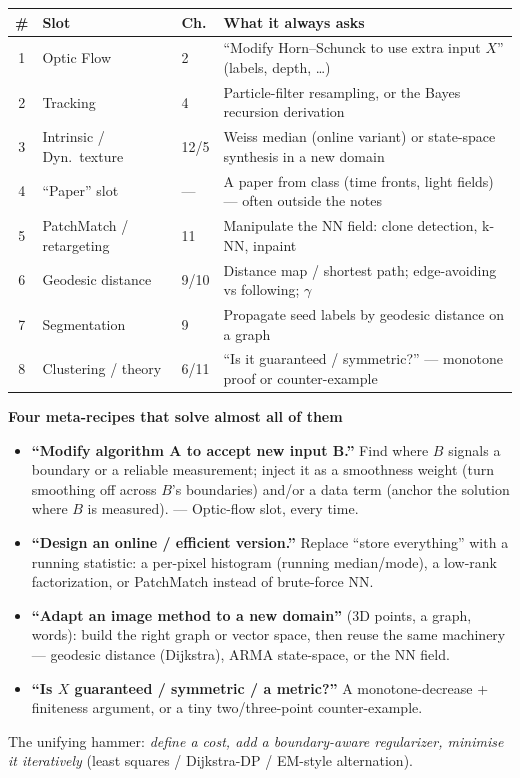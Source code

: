 \documentclass[11pt]{article}
\newcommand{\step}[1]{\smallskip\par\noindent\textbf{\textcolor{amber}{#1}}\par\nobreak}
\begin{document}
\begin{center}\small
\begin{tabular}{clll}
\textbf{\#} & \textbf{Slot} & \textbf{Ch.} & \textbf{What it always asks}\\[2pt]\hline
1 & Optic Flow & 2 & ``Modify Horn--Schunck to use extra input $X$'' (labels, depth, \dots)\\
2 & Tracking & 4 & Particle-filter resampling, or the Bayes recursion derivation\\
3 & Intrinsic / Dyn.\ texture & 12/5 & Weiss median (online variant) or state-space synthesis in a new domain\\
4 & ``Paper'' slot & --- & A paper from class (time fronts, light fields) --- often outside the notes\\
5 & PatchMatch / retargeting & 11 & Manipulate the NN field: clone detection, k-NN, inpaint\\
6 & Geodesic distance & 9/10 & Distance map / shortest path; edge-avoiding vs following; $\gamma$\\
7 & Segmentation & 9 & Propagate seed labels by geodesic distance on a graph\\
8 & Clustering / theory & 6/11 & ``Is it guaranteed / symmetric?'' --- monotone proof or counter-example\\
\end{tabular}
\end{center}

\step{Four meta-recipes that solve almost all of them}
\begin{itemize}
  \item \textbf{``Modify algorithm A to accept new input B.''} Find where $B$ signals a boundary or a reliable
  measurement; inject it as a smoothness weight (turn smoothing off across $B$'s boundaries) and/or a data term
  (anchor the solution where $B$ is measured). --- Optic-flow slot, every time.
  \item \textbf{``Design an online / efficient version.''} Replace ``store everything'' with a running statistic:
  a per-pixel histogram (running median/mode), a low-rank factorization, or PatchMatch instead of brute-force NN.
  \item \textbf{``Adapt an image method to a new domain''} (3D points, a graph, words): build the right graph or
  vector space, then reuse the same machinery --- geodesic distance (Dijkstra), ARMA state-space, or the NN field.
  \item \textbf{``Is $X$ guaranteed / symmetric / a metric?''} A monotone-decrease + finiteness argument, or a
  tiny two/three-point counter-example.
\end{itemize}
The unifying hammer: \emph{define a cost, add a boundary-aware regularizer, minimise it iteratively} (least squares
/ Dijkstra-DP / EM-style alternation).
\end{document}
